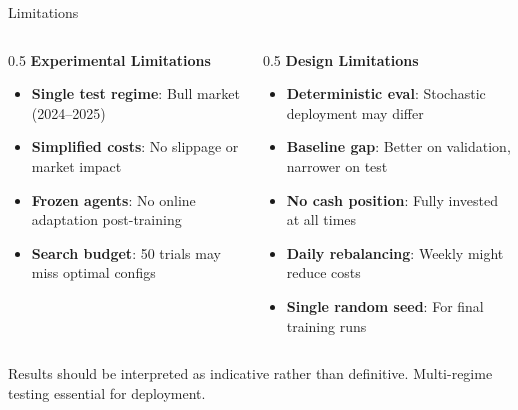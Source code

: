 \documentclass[aspectratio=169]{beamer}
\begin{document}
\begin{frame}{Limitations}
\footnotesize

\begin{columns}[T,totalwidth=\textwidth]
\begin{column}{0.5\textwidth}
\textbf{Experimental Limitations}
\begin{itemize}\setlength{\itemsep}{3pt}
  \item \textbf{Single test regime}: Bull market (2024--2025)
  \item \textbf{Simplified costs}: No slippage or market impact
  \item \textbf{Frozen agents}: No online adaptation post-training
  \item \textbf{Search budget}: 50 trials may miss optimal configs
\end{itemize}
\end{column}

\begin{column}{0.5\textwidth}
\textbf{Design Limitations}
\begin{itemize}\setlength{\itemsep}{3pt}
  \item \textbf{Deterministic eval}: Stochastic deployment may differ
  \item \textbf{Baseline gap}: Better on validation, narrower on test
  \item \textbf{No cash position}: Fully invested at all times
  \item \textbf{Daily rebalancing}: Weekly might reduce costs
  \item \textbf{Single random seed}: For final training runs
\end{itemize}
\end{column}
\end{columns}

\vspace{0.5em}
\centering
\scriptsize
Results should be interpreted as indicative rather than definitive. Multi-regime testing essential for deployment.

\end{frame}
\end{document}
